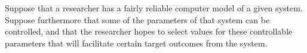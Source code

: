 \documentclass{article}
\begin{document}



Suppose that a researcher has a fairly reliable computer model of a given system. 
%
Suppose furthermore that some of the parameters of that system can be controlled, and that the researcher hopes to select values for these controllable parameters that will facilitate certain target outcomes from the system. 
%
\end{document}
